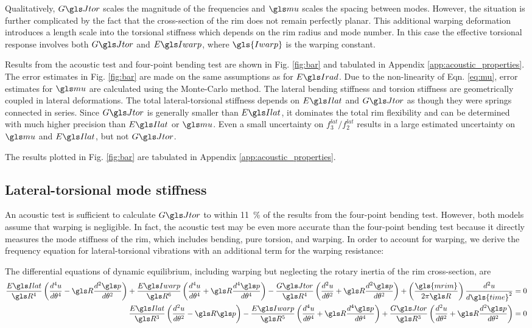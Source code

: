 \documentclass[../thesis.tex]{subfiles}
\begin{document}
Qualitatively, $\GJ$ scales the magnitude of the frequencies and $\m$ scales the spacing between modes. However, the situation is further complicated by the fact that the cross-section of the rim does not remain perfectly planar. This additional warping deformation introduces a length scale into the torsional stiffness which depends on the rim radius and mode number. In this case the effective torsional response involves both $\GJ$ and $\EIw$, where $\gls{Iwarp}$ is the warping constant.

Results from the acoustic test and four-point bending test are shown in Fig. \ref{fig:bar} and tabulated in Appendix \ref{app:acoustic_properties}. The error estimates in Fig. \ref{fig:bar} are made on the same assumptions as for $\EIr$. Due to the non-linearity of Eqn. \eqref{eq:mu}, error estimates for $\m$ are calculated using the Monte-Carlo method. The lateral bending stiffness and torsion stiffness are geometrically coupled in lateral deformations. The total lateral-torsional stiffness depends on $\EIl$ and $\GJ$ as though they were springs connected in series. Since $\GJ$ is generally smaller than $\EIl$, it dominates the total rim flexibility and can be determined with much higher precision than $\EIl$ or $\m$. Even a small uncertainty on $f_3^{lat}/f_2^{lat}$ results in a large estimated uncertainty on $\m$ and $\EIl$, but not $\GJ$.

The results plotted in Fig. \ref{fig:bar} are tabulated in Appendix \ref{app:acoustic_properties}.

\subsection{Lateral-torsional mode stiffness}
An acoustic test is sufficient to calculate $\GJ$ to within \SI{11}{\percent} of the results from the four-point bending test. However, both models assume that warping is negligible. In fact, the acoustic test may be even more accurate than the four-point bending test because it directly measures the mode stiffness of the rim, which includes bending, pure torsion, and warping. In order to account for warping, we derive the frequency equation for lateral-torsional vibrations with an additional term for the warping resistance:

The differential equations of dynamic equilibrium, including warping but neglecting the rotary inertia of the rim cross-section, are
\begin{subequations}\label{eq:lat_eq}
\begin{align}
\frac{\EIl}{\R^4}\left(\dt{u}{4} - \R\dt{\p}{2}\right) +
\frac{\EIw}{\R^6} \left(\dt{u}{4} + \R\dt{\p}{4}\right) -
\frac{\GJ}{\R^4}\left(\dt{u}{2} + \R\dt{\p}{2}\right) +
\left(\frac{\gls{mrim}}{2\pi \R}\right) \frac{d^2u}{d\gls{time}^2} = 0\\
\frac{\EIl}{\R^3}\left(\dt{u}{2} - \R\p\right) -
\frac{\EIw}{\R^5}\left(\dt{u}{4} + \R\dt{\p}{4}\right) +
\frac{\GJ}{\R^3}\left(\dt{u}{2} + \R\dt{\p}{2}\right) = 0
\end{align}
\end{subequations}
\end{document}
